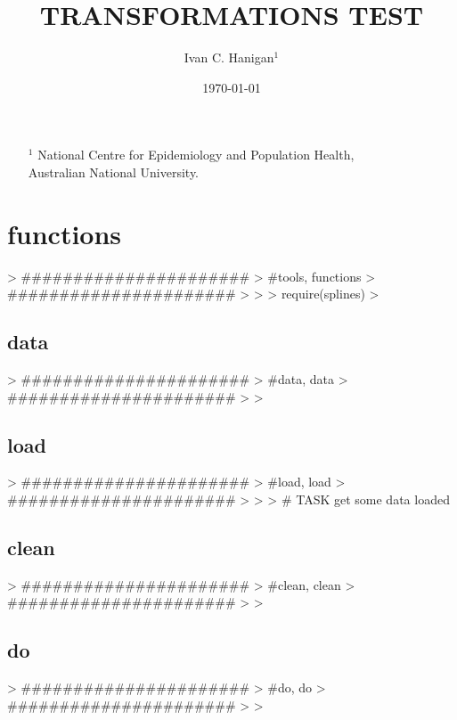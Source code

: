 \documentclass[a4paper]{article}
\begin{document}
\title{TRANSFORMATIONS TEST} 
\author{Ivan C. Hanigan$^{1}$}
\date{\today}                 
\maketitle
\begin{itemize}
\item [$^1$] National Centre for Epidemiology and Population Health, \\Australian National University.
\end{itemize}

\setcounter{page}{1}
\tableofcontents 
{}
\setcounter{page}{1}

\section{functions}

\begin{Schunk}
\begin{Sinput}
> ######################
> #tools,  functions
> ######################
>       
> 
> require(splines)
> 
\end{Sinput}
\end{Schunk}

\subsection{data}

\begin{Schunk}
\begin{Sinput}
> ######################
> #data,  data
> ######################
>       
> 
\end{Sinput}
\end{Schunk}

\subsection{load}

\begin{Schunk}
\begin{Sinput}
> ######################
> #load,  load
> ######################
>       
> 
> # TASK get some data loaded
\end{Sinput}
\end{Schunk}

\subsection{clean}

\begin{Schunk}
\begin{Sinput}
> ######################
> #clean,  clean
> ######################
>       
> 
\end{Sinput}
\end{Schunk}

\subsection{do}

\begin{Schunk}
\begin{Sinput}
> ######################
> #do,  do
> ######################
>       
> 
\end{Sinput}
\end{Schunk}
\end{document}
